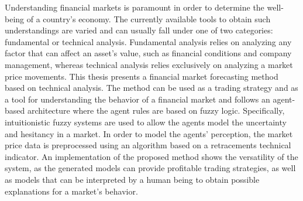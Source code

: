 Understanding financial markets is paramount in order to determine the well-being of a country's economy. The currently available tools to obtain such understandings are varied and can usually fall under one of two categories: fundamental or technical analysis. Fundamental analysis relies on analyzing any factor that can affect an asset's value, such as financial conditions and company management, whereas technical analysis relies exclusively on analyzing a market price movements. This thesis presents a financial market forecasting method based on technical analysis. The method can be used as a trading strategy and as a tool for understanding the behavior of a financial market and follows an agent-based architecture where the agent rules are based on fuzzy logic. Specifically, intuitionistic fuzzy systems are used to allow the agents model the uncertainty and hesitancy in a market. In order to model the agents' perception, the market price data is preprocessed using an algorithm based on a retracements technical indicator. An implementation of the proposed method shows the versatility of the system, as the generated models can provide profitable trading strategies, as well as models that can be interpreted by a human being to obtain possible explanations for a market's behavior.